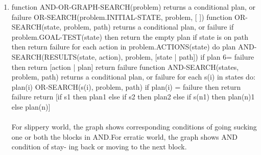 \documentclass[12pt]{article}
\begin{document}
\begin{enumerate}[label=(\alph*)]
  \item 
function AND-OR-GRAPH-SEARCH(problem) returns a conditional plan, or failure 
OR-SEARCH(problem.INITIAL-STATE, problem, [ ])
function OR-SEARCH(state, problem, path) returns a conditional plan, or failure
if problem.GOAL-TEST(state) then return the empty plan
if state is on path then return failure
for each action in problem.ACTIONS(state) do
plan AND-SEARCH(RESULTS(state, action), problem, [state | path])
if plan 6= failure then return [action | plan]
return failure
function AND-SEARCH(states, problem, path) returns a conditional plan, or failure
for each s(i) in states do:\\
plan(i) OR-SEARCH(s(i), problem, path)
if plan(i) = failure then return failure
return [if s1 then plan1
else if s2 then plan2
else if s(n1) then plan(n)1
else plan(n)]
\\\\
For slippery world, the graph shows corresponding conditions of going sucking one
or both the blocks in AND.For erratic world, the graph shows AND condition of stay-
ing back or moving to the next block.
\end{enumerate}
\end{document}
